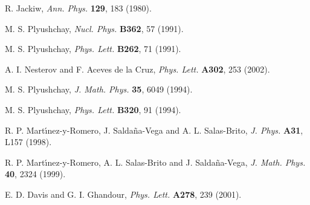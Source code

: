 \documentclass[a4paper,twocolumn,aps,showpacs,showkeys]{revtex4}
\begin{document}
\begin{thebibliography}{99}
 R. Jackiw, {\it Ann. Phys.} {\bf 129}, 183 (1980).

 M. S. Plyushchay, {\it Nucl. Phys.} {\bf B362}, 57 (1991).

 M. S. Plyushchay, {\it Phys. Lett.} {\bf B262}, 71 (1991).

 A. I. Nesterov and F. Aceves de la Cruz, {\it Phys. Lett.} {\bf A302}, 253 (2002).

 M. S. Plyushchay, {\it J. Math. Phys.} {\bf 35}, 6049 (1994).

 M. S. Plyushchay, {\it Phys. Lett.} {\bf B320}, 91 (1994).

 R. P. Mart{\'\i}nez-y-Romero, J. Salda\~na-Vega and A. L.
Salas-Brito, {\it J. Phys.} {\bf A31}, L157 (1998).

 R. P. Mart{\'\i}nez-y-Romero, A. L. Salas-Brito and
J. Salda\~na-Vega, {\it J. Math. Phys.} {\bf 40}, 2324 (1999).

 E. D. Davis and G. I. Ghandour, {\it Phys. Lett.} {\bf
A278}, 239 (2001).

\end{thebibliography}
\end{document}
